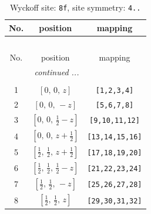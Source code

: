 \documentclass[fleqn,8pt]{jsarticle}
\begin{document}
\begin{longtable}{ccc}
\caption{Wyckoff site: {\tt 8f}, site symmetry: {\tt 4..}}
 \\
 \hline \hline
No. & position & mapping \\ \hline \endfirsthead

\multicolumn{2}{l}{\tablename\ \thetable{}} \\
 \hline \hline
No. & position & mapping \\ \hline \endhead

 \hline \hline
\multicolumn{2}{r}{\footnotesize\it continued ...} \\ \endfoot

 \hline \hline
\multicolumn{2}{r}{} \\ \endlastfoot

1 & $\left[ 0,\, 0,\, z \right]$ & {\tt [1,2,3,4]} \\ \hline
2 & $\left[ 0,\, 0,\, - z \right]$ & {\tt [5,6,7,8]} \\ \hline
3 & $\left[ 0,\, 0,\, \frac{1}{2} - z \right]$ & {\tt [9,10,11,12]} \\ \hline
4 & $\left[ 0,\, 0,\, z + \frac{1}{2} \right]$ & {\tt [13,14,15,16]} \\ \hline
5 & $\left[ \frac{1}{2},\, \frac{1}{2},\, z + \frac{1}{2} \right]$ & {\tt [17,18,19,20]} \\ \hline
6 & $\left[ \frac{1}{2},\, \frac{1}{2},\, \frac{1}{2} - z \right]$ & {\tt [21,22,23,24]} \\ \hline
7 & $\left[ \frac{1}{2},\, \frac{1}{2},\, - z \right]$ & {\tt [25,26,27,28]} \\ \hline
8 & $\left[ \frac{1}{2},\, \frac{1}{2},\, z \right]$ & {\tt [29,30,31,32]} \\
\end{longtable}
\renewcommand{\arraystretch}{1.2}
\end{document}
